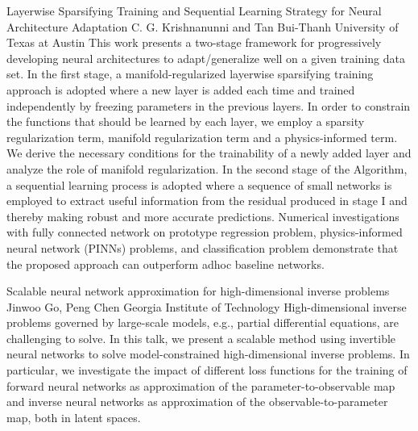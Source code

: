 \begin{addmargin}[2em]{0em}
\vspace{1.5ex}
\abs
{Layerwise Sparsifying Training and Sequential Learning Strategy for Neural Architecture Adaptation}
{C. G. Krishnanunni and Tan Bui-Thanh}
{University of Texas at Austin}
{This work presents a two-stage framework for progressively developing neural architectures to adapt/generalize well on a given training data set.  In the first stage, a manifold-regularized layerwise sparsifying training approach is adopted where a new layer is added each time and trained independently by freezing parameters in the previous layers.  In order to constrain the functions that should be learned by each layer,  we employ a sparsity regularization term, manifold regularization term and a physics-informed term. We derive the necessary conditions for the trainability of a newly added layer and analyze the role of manifold regularization. In the second stage of the Algorithm, a sequential learning process is adopted where a sequence of small networks is employed to extract useful information from the residual produced in stage I and thereby making robust and more accurate predictions. Numerical investigations with fully connected network on prototype regression problem, physics-informed neural network (PINNs) problems, and classification problem demonstrate that the proposed approach can outperform adhoc baseline networks.}


\vspace{1.5ex}
\abs
{Scalable neural network approximation for high-dimensional inverse problems}
{Jinwoo Go, Peng Chen}
{Georgia Institute of Technology}
{High-dimensional inverse problems governed by large-scale models, e.g., partial differential equations, are challenging to solve. In this talk, we present a scalable method using invertible neural networks to solve model-constrained high-dimensional inverse problems. In particular, we investigate the impact of different loss functions for the training of forward neural networks as approximation of the parameter-to-observable map and inverse neural networks as approximation of the observable-to-parameter map, both in latent spaces.}
\end{addmargin}



